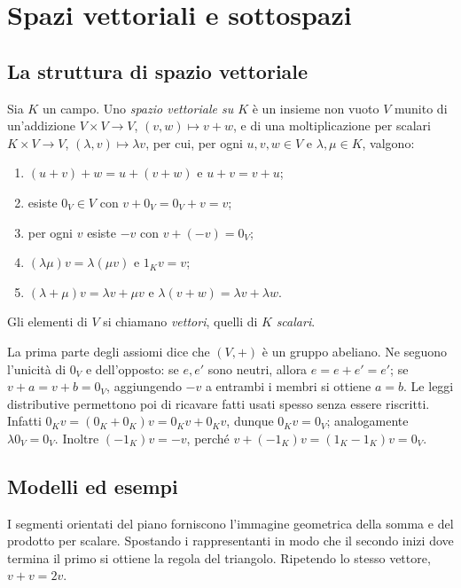 \chapter{Spazi vettoriali e sottospazi}

\section{La struttura di spazio vettoriale}
\begin{definizione}
Sia $K$ un campo. Uno \emph{spazio vettoriale su $K$} è un insieme non
vuoto $V$ munito di un'addizione $V\times V\to V$, $(v,w)\mapsto v+w$, e
di una moltiplicazione per scalari $K\times V\to V$,
$(\lambda,v)\mapsto\lambda v$, per cui, per ogni $u,v,w\in V$ e
$\lambda,\mu\in K$, valgono:
\begin{enumerate}[label=(\arabic*)]
\item $(u+v)+w=u+(v+w)$ e $u+v=v+u$;
\item esiste $0_V\in V$ con $v+0_V=0_V+v=v$;
\item per ogni $v$ esiste $-v$ con $v+(-v)=0_V$;
\item $(\lambda\mu)v=\lambda(\mu v)$ e $1_Kv=v$;
\item $(\lambda+\mu)v=\lambda v+\mu v$ e
      $\lambda(v+w)=\lambda v+\lambda w$.
\end{enumerate}
Gli elementi di $V$ si chiamano \emph{vettori}, quelli di $K$ \emph{scalari}.
\end{definizione}

La prima parte degli assiomi dice che $(V,+)$ è un gruppo abeliano. Ne
seguono l'unicità di $0_V$ e dell'opposto: se $e,e'$ sono neutri, allora
$e=e+e'=e'$; se $v+a=v+b=0_V$, aggiungendo $-v$ a entrambi i membri si
ottiene $a=b$. Le leggi distributive permettono poi di ricavare fatti
usati spesso senza essere riscritti. Infatti
$0_Kv=(0_K+0_K)v=0_Kv+0_Kv$, dunque $0_Kv=0_V$; analogamente
$\lambda0_V=0_V$. Inoltre $(-1_K)v=-v$, perché
$v+(-1_K)v=(1_K-1_K)v=0_V$.

\section{Modelli ed esempi}
I segmenti orientati del piano forniscono l'immagine geometrica della
somma e del prodotto per scalare. Spostando i rappresentanti in modo che
il secondo inizi dove termina il primo si ottiene la regola del triangolo.
Ripetendo lo stesso vettore, $v+v=2v$.
\begin{schema}
\end{schema}

